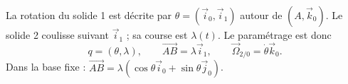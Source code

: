\begin{corrigebox}
La rotation du solide 1 est décrite par
$\theta=(\vec i_0,\vec i_1)$ autour de $(A,\vec k_0)$. Le solide 2 coulisse
suivant $\vec i_1$ ; sa course est $\lambda(t)$. Le paramétrage est donc
\[q=(\theta,\lambda),\qquad \overrightarrow{AB}=\lambda\vec i_1,
  \qquad \vec\Omega_{2/0}=\dot\theta\vec k_0.\]
Dans la base fixe :
$\overrightarrow{AB}=\lambda(\cos\theta\vec i_0+\sin\theta\vec j_0)$.
\end{corrigebox}
